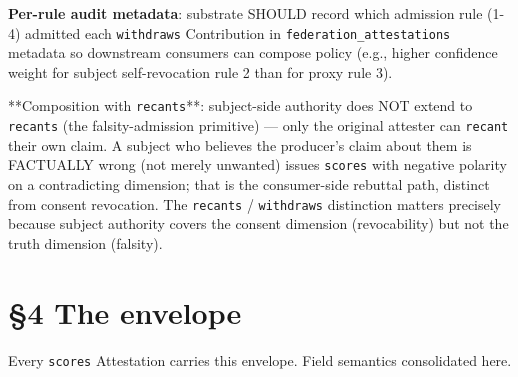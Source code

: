 \documentclass[11pt]{article}
\begin{document}
\textbf{Per-rule audit metadata}: substrate SHOULD record which admission rule (1-4) admitted each \texttt{withdraws} Contribution in \texttt{federation\_attestations} metadata so downstream consumers can compose policy (e.g., higher confidence weight for subject self-revocation rule 2 than for proxy rule 3).


**Composition with \texttt{recants}**: subject-side authority does NOT extend to \texttt{recants} (the falsity-admission primitive) — only the original attester can \texttt{recant} their own claim. A subject who believes the producer's claim about them is FACTUALLY wrong (not merely unwanted) issues \texttt{scores} with negative polarity on a contradicting dimension; that is the consumer-side rebuttal path, distinct from consent revocation. The \texttt{recants} / \texttt{withdraws} distinction matters precisely because subject authority covers the consent dimension (revocability) but not the truth dimension (falsity).




\clearpage


\section*{§4 The envelope}


Every \texttt{scores} Attestation carries this envelope. Field semantics consolidated here.
\end{document}
